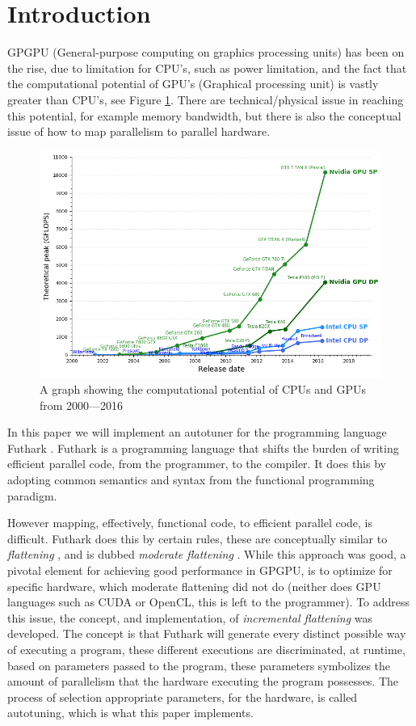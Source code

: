 \section{Introduction}
GPGPU (General-purpose computing on graphics processing units) has been on the rise, due to limitation for CPU's, such as power limitation, and the fact that the computational potential of GPU's (Graphical processing unit) is vastly greater than CPU's, see Figure \ref{potential}. There are technical/physical issue in reaching this potential, for example memory bandwidth, but there is also the conceptual issue of how to map parallelism to parallel hardware.
\begin{figure}[h]
	\centering
	\includegraphics[width=.8\textwidth]{resources/graf.png}
	\caption{A graph showing the computational potential of CPUs and GPUs from 2000---2016 \cite{cpu-vs-gpu}}
	\label{potential}
\end{figure}
In this paper we will implement an autotuner for the programming language Futhark \cite{futhark-home}. Futhark is a programming language that shifts the burden of writing efficient parallel code, from the programmer, to the compiler. It does this by adopting common semantics and syntax from the functional programming paradigm.

However mapping, effectively, functional code, to efficient parallel code, is difficult. Futhark does this by certain rules, these are conceptually similar to \textit{flattening} \cite{flat}, and is dubbed \textit{moderate flattening} \cite{futhark-nested-para}. While this approach was good, a pivotal element for achieving good performance in GPGPU, is to optimize for specific hardware, which moderate flattening did not do (neither does GPU languages such as CUDA or OpenCL, this is left to the programmer). To address this issue, the concept, and implementation, of \textit{incremental flattening} was developed. The concept is that Futhark will generate every distinct possible way of executing a program, these different executions are discriminated, at runtime, based on parameters passed to the program, these parameters symbolizes the amount of parallelism that the hardware executing the program possesses. The process of selection appropriate parameters, for the hardware, is called autotuning, which is what this paper implements.